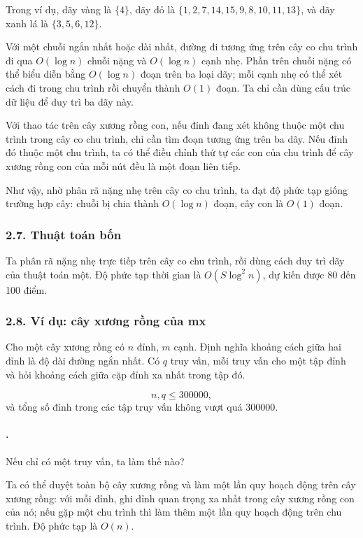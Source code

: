 \documentclass[11pt]{article}
\begin{document}
Trong ví dụ, dãy vàng là \(\{4\}\), dãy đỏ là
\(\{1,2,7,14,15,9,8,10,11,13\}\), và dãy xanh lá là
\(\{3,5,6,12\}\).

Với một chuỗi ngắn nhất hoặc dài nhất, đường đi tương ứng trên cây co chu
trình đi qua \(O(\log n)\) chuỗi nặng và \(O(\log n)\) cạnh nhẹ. Phần trên
chuỗi nặng có thể biểu diễn bằng \(O(\log n)\) đoạn trên ba loại dãy; mỗi
cạnh nhẹ có thể xét cách đi trong chu trình rồi chuyển thành \(O(1)\) đoạn.
Ta chỉ cần dùng cấu trúc dữ liệu để duy trì ba dãy này.

Với thao tác trên cây xương rồng con, nếu đỉnh đang xét không thuộc một chu
trình trong cây co chu trình, chỉ cần tìm đoạn tương ứng trên ba dãy. Nếu đỉnh
đó thuộc một chu trình, ta có thể điều chỉnh thứ tự các con của chu trình để
cây xương rồng con của mỗi nút đều là một đoạn liên tiếp.

Như vậy, nhờ phân rã nặng nhẹ trên cây co chu trình, ta đạt độ phức tạp giống
trường hợp cây: chuỗi bị chia thành \(O(\log n)\) đoạn, cây con là \(O(1)\)
đoạn.

\subsubsection*{2.7. Thuật toán bốn}

Ta phân rã nặng nhẹ trực tiếp trên cây co chu trình, rồi dùng cách duy trì dãy
của thuật toán một. Độ phức tạp thời gian là \(O(S\log^2 n)\), dự kiến được
80 đến 100 điểm.

\subsubsection*{2.8. Ví dụ: cây xương rồng của mx}

Cho một cây xương rồng có \(n\) đỉnh, \(m\) cạnh. Định nghĩa khoảng cách giữa
hai đỉnh là độ dài đường ngắn nhất. Có \(q\) truy vấn, mỗi truy vấn cho một
tập đỉnh và hỏi khoảng cách giữa cặp đỉnh xa nhất trong tập đó.

\[
  n,q\le 300000,
\]
và tổng số đỉnh trong các tập truy vấn không vượt quá \(300000\).

\paragraph{.}
Nếu chỉ có một truy vấn, ta làm thế nào?

Ta có thể duyệt toàn bộ cây xương rồng và làm một lần quy hoạch động trên cây
xương rồng: với mỗi đỉnh, ghi đỉnh quan trọng xa nhất trong cây xương rồng con
của nó; nếu gặp một chu trình thì làm thêm một lần quy hoạch động trên chu
trình. Độ phức tạp là \(O(n)\).
\end{document}

